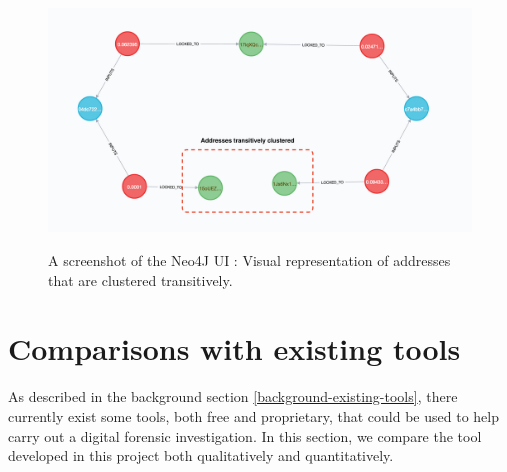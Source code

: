 \begin{figure}[h!]
  \centering
  \includegraphics[width = 15cm]{./figures/neo4j-screenshots/addresses-transitively-clustered}\\[0.5cm] 
  \caption{A screenshot of the Neo4J UI : Visual representation of addresses that are clustered transitively.}
  \label{fig:neo4j-transitive-clustering-screenshot}
\end{figure}

\section{Comparisons with existing tools}
As described in the background section \ref{background-existing-tools}, there currently exist some tools, both free and proprietary, that could be used to help carry out a digital forensic investigation. In this section, we compare the tool developed in this project both qualitatively and quantitatively.

